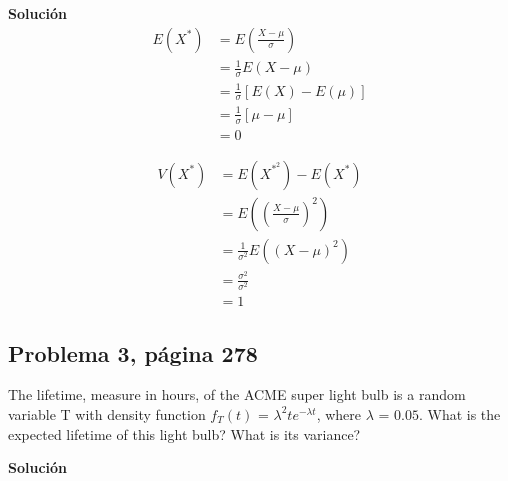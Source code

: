 \documentclass{article}
\begin{document}
\noindent \textbf{Solución}
\begin{align}
\nonumber
E{(X^*)}    & =  E\left(\frac{X - \mu}{\sigma}\right)\\ \nonumber
            & =  \frac{1}{\sigma}E(X - \mu) \\ \nonumber
            & =  \frac{1}{\sigma}[E(X) - E(\mu)] \\ \nonumber
            & =  \frac{1}{\sigma}[\mu - \mu] \\ \nonumber
            & = 0
\end{align}

\begin{align}
\nonumber
V{(X^*)}    & =  E{(X^*^2)} - E{(X^*)}\\ \nonumber
            & =  E\left(\left(\frac{X - \mu}{\sigma}\right)^2 \right)\\ \nonumber
            & =  \frac{1}{\sigma^2}E((X - \mu)^2) \\ \nonumber
            & =  \frac{\sigma^2}{\sigma^2} \\ \nonumber
            & = 1
\end{align}




\subsection{Problema 3, página 278}
The lifetime, measure in hours, of the ACME super light bulb is a random variable T with density function $f_{T}(t)$ = $\lambda^2 te^{- \lambda t}$, where $\lambda$ = $0.05$. What is the expected lifetime of this light bulb? What is its variance?

\noindent \textbf{Solución}
\end{document}
